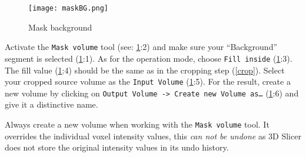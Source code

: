 \pagebreak
\begin{figure}[h!]
	\centerline{
		\texttt{[image: maskBG.png]}}
	\caption{Mask background}\label{fig:mBG}
\end{figure}
\noindent
Activate the \texttt{Mask volume} tool (see: \cref{fig:mBG}:2) and make sure your ``Background'' segment is selected (\cref{fig:mBG}:1).
As for the operation mode, choose \texttt{Fill inside} (\cref{fig:mBG}:3).
The fill value (\cref{fig:mBG}:4) should be the same as in the cropping step (\cref{crop}).
Select your cropped source volume as the \texttt{Input Volume} (\cref{fig:mBG}:5).
For the result, create a new volume by clicking on \texttt{Output Volume -> Create new Volume as\ldots} (\cref{fig:mBG}:6) and give it a distinctive name.
\newline %
\newline
\begin{minipage}{0.4\textwidth}
	\begin{center}
		
	\end{center}
\end{minipage}%
%
\begin{minipage}{0.5\textwidth}
	Always create a new volume when working with the \texttt{Mask volume} tool.
	It overrides the individual voxel intensity values, this \emph{can not be undone} as 3D Slicer does not store the original intensity values in its undo history.
\end{minipage}
\pagebreak

